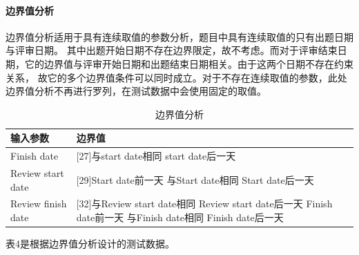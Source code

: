 \documentclass[hyperref, a4paper]{ctexart}
\let\oldparagraph\paragraph
\renewcommand{\paragraph}[1]{\oldparagraph{#1}\mbox{}}
\begin{document}
\begin{table}[!htbp]
\begin{tabular}{|p{0.35cm}|p{1.2cm}|p{0.22cm}|p{0.22cm}|p{0.22cm}|p{0.22cm}|p{0.22cm}|p{0.22cm}|p{0.9cm}|p{0.9cm}|p{0.9cm}|p{0.9cm}|p{0.22cm}|p{0.8cm}|}
  \hline
  \end{tabular}
\end{table}

\hypertarget{ux8fb9ux754cux503cux5206ux6790}{%
\paragraph{边界值分析}\label{ux8fb9ux754cux503cux5206ux6790}}

边界值分析适用于具有连续取值的参数分析，题目中具有连续取值的只有出题日期与评审日期。
其中出题开始日期不存在边界限定，故不考虑。而对于评审结束日期，它的边界值与评审开始日期和出题结束日期相关。由于这两个日期不存在约束关系，
故它的多个边界值条件可以同时成立。对于不存在连续取值的参数，此处边界值分析不再进行罗列，在测试数据中会使用固定的取值。

\begin{table}[!htbp]
  \caption{边界值分析}
  \label{Tab:bookRWCal}
  \centering
  \begin{tabular}{|p{6.0cm}|p{6.5cm}|}
  \hline
  \textbf{输入参数} &\textbf{边界值} \\
  \hline
  Finish date     & [27]与start date相同   \newline [28] start date后一天 \\
  \hline
  Review start date     & [29]Start date前一天     \newline [30]与Start date相同  \newline  [31]Start date后一天 \\
  \hline
  Review finish date     & [32]与Review start date相同     \newline [33]Review start date后一天 \newline [34]Finish date前一天 \newline [35]与Finish date相同  \newline  [36]Finish date后一天\\
  \hline
  \end{tabular}
\end{table}

表4是根据边界值分析设计的测试数据。
\end{document}

